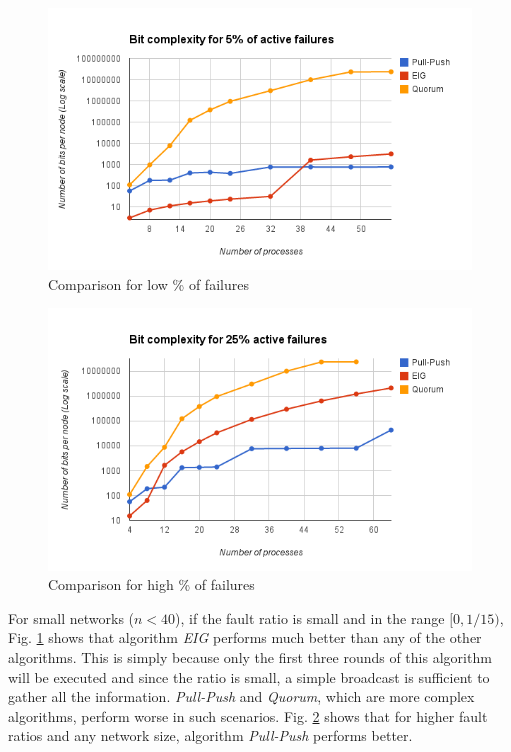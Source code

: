 \begin{figure}[ht]
 \centering
\vspace{-3mm}
\includegraphics[scale=0.4]{Fault5}
\vspace{-1mm}
\caption{Comparison for low \% of failures}
 \label{fig:fault5}
\vspace{-4mm}
\end{figure}

\begin{figure}[ht]
 \centering
\vspace{-2mm}
\includegraphics[scale=0.4]{Fault25}
\vspace{-1mm}
\caption{Comparison for high \% of failures}
 \label{fig:fault25}
\vspace{-4mm}
\end{figure}

For small networks ($n < 40$), if the fault ratio is small and in the range $[0, 1/15)$, Fig. \ref{fig:fault5} shows that algorithm \textit{EIG} performs much better than any of the other algorithms. This is simply because only the first three rounds of this algorithm will be executed and since the ratio is small, a simple broadcast is sufficient to gather all the information. \textit{Pull-Push} and \textit{Quorum}, which are more complex algorithms, perform worse in such scenarios. Fig. \ref{fig:fault25} shows that for higher fault ratios and any network size, algorithm \textit{Pull-Push} performs better.

